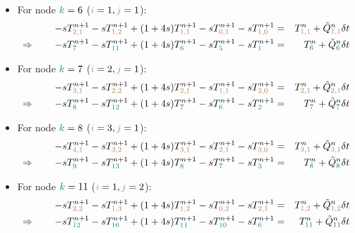 \begin{itemize}
\item For node ${\color{teal}k}=6$ (${\color{brown}i}=1,{\color{brown}j}=1$):
\begin{eqnarray}
-s T_{{\color{brown}2,1}}^{n+1}
-s T_{{\color{brown}1,2}}^{n+1} 
+(1+4s)T_{{\color{brown}1,1}}^{n+1} 
-s T_{{\color{brown}0,1}}^{n+1} 
-s T_{{\color{brown}1,0}}^{n+1} 
&=& T_{{\color{brown}1,1}}^n +\tilde{Q}_{{\color{brown}1,1}}^n \delta t\nonumber\\
\Rightarrow \qquad
-s T_{{\color{teal} 7}}^{n+1}-s T_{{\color{teal} 11}}^{n+1} +(1+4s)T_{{\color{teal} 6}}^{n+1} 
-s T_{{\color{teal} 5}}^{n+1} -s T_{{\color{teal} 1}}^{n+1} 
&=& T_{{\color{teal} 6}}^n +\tilde{Q}_{{\color{teal} 6}}^n\delta t
\end{eqnarray}

\item For node ${\color{teal}k}=7$ (${\color{brown}i}=2,{\color{brown}j}=1$):
\begin{eqnarray}
-s T_{{\color{brown} 3,1}}^{n+1}
-s T_{{\color{brown}2,2}}^{n+1} 
+(1+4s)T_{{\color{brown}2,1}}^{n+1} 
-s T_{{\color{brown}1,1}}^{n+1} 
-s T_{{\color{brown}2,0}}^{n+1} 
&=& T_{{\color{brown}2,1}}^n 
+\tilde{Q}_{{\color{brown}2,1}}^n \delta t\nonumber\\
\Rightarrow \qquad
-s T_{{\color{teal} 8}}^{n+1}
-s T_{{\color{teal} 12}}^{n+1} 
+(1+4s)T_{{\color{teal}7}}^{n+1} 
-s T_{{\color{teal}6}}^{n+1} 
-s T_{{\color{teal}2}}^{n+1} 
&=& T_{{\color{teal}7}}^n 
+\tilde{Q}_{{\color{teal}7}}^n \delta t
\end{eqnarray}

\item For node ${\color{teal}k}=8$ (${\color{brown}i}=3,{\color{brown}j}=1$):
\begin{eqnarray}
-s T_{{\color{brown} 4,1}}^{n+1}
-s T_{{\color{brown}3,2}}^{n+1} 
+(1+4s)T_{{\color{brown}3,1}}^{n+1} 
-s T_{{\color{brown}2,1}}^{n+1} 
-s T_{{\color{brown}3,0}}^{n+1} 
&=& T_{{\color{brown}3,1}}^n 
+\tilde{Q}_{{\color{brown}3,1}}^n \delta t\nonumber\\
\Rightarrow \qquad
-s T_{{\color{teal} 9}}^{n+1}
-s T_{{\color{teal} 13}}^{n+1} 
+(1+4s)T_{{\color{teal}8}}^{n+1} 
-s T_{{\color{teal}7}}^{n+1} 
-s T_{{\color{teal}3}}^{n+1} 
&=& T_{{\color{teal}8}}^n 
+\tilde{Q}_{{\color{teal}8}}^n \delta t
\end{eqnarray}

\item For node ${\color{teal}k}=11$ (${\color{brown}i}=1,{\color{brown}j}=2$):
\begin{eqnarray}
-s T_{{\color{brown} 2,2}}^{n+1}
-s T_{{\color{brown}1,3}}^{n+1} 
+(1+4s)T_{{\color{brown}1,2}}^{n+1} 
-s T_{{\color{brown}0,2}}^{n+1} 
-s T_{{\color{brown}2,1}}^{n+1} 
&=& T_{{\color{brown}1,2}}^n 
+\tilde{Q}_{{\color{brown}1,2}}^n \delta t\nonumber\\
\Rightarrow \qquad
-s T_{{\color{teal} 12}}^{n+1}
-s T_{{\color{teal} 16}}^{n+1} 
+(1+4s)T_{{\color{teal}11}}^{n+1} 
-s T_{{\color{teal}10}}^{n+1} 
-s T_{{\color{teal}6}}^{n+1} 
&=& T_{{\color{teal}11}}^n 
+\tilde{Q}_{{\color{teal}11}}^n\delta t
\end{eqnarray}


\end{itemize}
